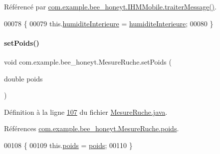 Référencé par \hyperlink{_i_h_m_mobile_8java_source_l00374}{com.\+example.\+bee\+\_\+honeyt.\+I\+H\+M\+Mobile.\+traiter\+Message()}.


\begin{DoxyCode}
00078     \{
00079         this.\hyperlink{classcom_1_1example_1_1bee__honeyt_1_1_mesure_ruche_a3b5d2536649e0acaf1eebeba4409c9bb}{humiditeInterieure} = \hyperlink{classcom_1_1example_1_1bee__honeyt_1_1_mesure_ruche_a3b5d2536649e0acaf1eebeba4409c9bb}{humiditeInterieure};
00080     \}
\end{DoxyCode}
\mbox{\label{classcom_1_1example_1_1bee__honeyt_1_1_mesure_ruche_aecea2cf7cc504caa34bef93a0e1f3826}} 
\paragraph{\texorpdfstring{set\+Poids()}{setPoids()}}
{\footnotesize\ttfamily void com.\+example.\+bee\+\_\+honeyt.\+Mesure\+Ruche.\+set\+Poids (\begin{DoxyParamCaption}\item[{double}]{poids }\end{DoxyParamCaption})}



Définition à la ligne \hyperlink{_mesure_ruche_8java_source_l00107}{107} du fichier \hyperlink{_mesure_ruche_8java_source}{Mesure\+Ruche.\+java}.



Références \hyperlink{_mesure_ruche_8java_source_l00022}{com.\+example.\+bee\+\_\+honeyt.\+Mesure\+Ruche.\+poids}.


\begin{DoxyCode}
00108     \{
00109         this.\hyperlink{classcom_1_1example_1_1bee__honeyt_1_1_mesure_ruche_a9aa6c575b7b69c4fb3825944e1f50722}{poids} = \hyperlink{classcom_1_1example_1_1bee__honeyt_1_1_mesure_ruche_a9aa6c575b7b69c4fb3825944e1f50722}{poids};
00110     \}
\end{DoxyCode}
\mbox{\label{classcom_1_1example_1_1bee__honeyt_1_1_mesure_ruche_a87cff86af4a7e977aac1caeaf6a37bc8}} 
